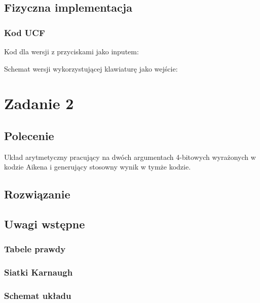 \documentclass[a4paper,12pt]{extarticle}  %
\begin{document}
\subsection{Fizyczna implementacja}
\subsubsection{Kod UCF}
Kod dla wersji z przyciskami jako inputem:

Schemat wersji wykorzystującej klawiaturę jako wejście:
\section{Zadanie 2}
\subsection{Polecenie}
Układ arytmetyczny pracujący na dwóch argumentach 4-bitowych wyrażonych w kodzie Aikena
i generujący stosowny wynik w tymże kodzie. 
\subsection{Rozwiązanie}
\subsection{Uwagi wstępne}

\subsubsection{Tabele prawdy} %
\subsubsection{Siatki Karnaugh}
\subsubsection{Schemat układu}
\begin{figure}[H]
	\centering
\end{figure}
\end{document}
